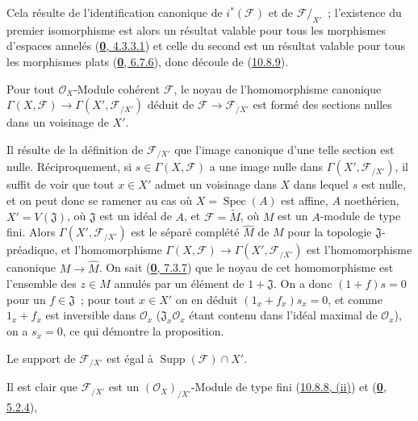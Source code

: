 Cela résulte de l'identification canonique de $i^*(\mathscr{F})$ et de
$\mathscr{F}/_{X'}$~; l'existence du premier isomorphisme est alors un
résultat valable pour tous les morphismes d'espaces annelés
(\hyperref[0.4.3.3.1-fr]{\textbf{0}, 4.3.3.1}) et celle du second est un résultat
valable pour tous les morphismes plats
(\hyperref[0.6.7.6-fr]{\textbf{0}, 6.7.6}), donc découle de
(\hyperref[I.10.8.9-fr]{10.8.9}).

\begin{proposition}[10.8.11]
\label{I.10.8.11-fr}
Pour tout $\mathscr{O}_X$-Module cohérent $\mathscr{F}$, le noyau de
l'homomorphisme canonique
$\Gamma(X,\mathscr{F})\to\Gamma(X',\mathscr{F}_{/X'})$ déduit de
$\mathscr{F}\to\mathscr{F}_{/X'}$ est formé des sections nulles dans un
voisinage de $X'$.
\end{proposition}

Il résulte de la définition de $\mathscr{F}_{/X'}$ que l'image canonique
d'une telle section est nulle. Réciproquement, si
$s\in\Gamma(X,\mathscr{F})$ a une image nulle dans
$\Gamma(X',\mathscr{F}_{/X'})$, il suffit de voir que tout $x\in X'$ admet
un voisinage dans $X$ dans lequel $s$ est nulle, et on peut donc se ramener
au cas où $X=\operatorname{Spec}(A)$ est affine, $A$ noethérien,
$X'=V(\mathfrak{J})$, où $\mathfrak{J}$ est un idéal de $A$, et
$\mathscr{F}=\widetilde M$, où $M$ est un $A$-module de type fini. Alors
$\Gamma(X',\mathscr{F}_{/X'})$ est le séparé complété $\widehat M$ de $M$
pour la topologie $\mathfrak{J}$-préadique, et l'homomorphisme
$\Gamma(X,\mathscr{F})\to\Gamma(X',\mathscr{F}_{/X'})$ est
l'homomorphisme canonique $M\to\widehat M$. On sait
(\hyperref[0.7.3.7-fr]{\textbf{0}, 7.3.7}) que le noyau de cet homomorphisme est
l'ensemble des $z\in M$ annulés par un élément de $1+\mathfrak{J}$. On a
donc $(1+f)s=0$ pour un $f\in\mathfrak{J}$~; pour tout $x\in X'$ on en
déduit $(1_x+f_x)s_x=0$, et comme $1_x+f_x$ est inversible dans
$\mathscr{O}_x$ ($\mathfrak{J}_x\mathscr{O}_x$ étant contenu dans l'idéal
maximal de $\mathscr{O}_x$), on a $s_x=0$, ce qui démontre la proposition.

\begin{corollary}[10.8.12]
\label{I.10.8.12-fr}
Le support de $\mathscr{F}_{/X'}$ est égal à
$\operatorname{Supp}(\mathscr{F})\cap X'$.
\end{corollary}

Il est clair que $\mathscr{F}_{/X'}$ est un
$(\mathscr{O}_X)_{/X'}$-Module de type fini
(\hyperref[I.10.8.8-fr]{10.8.8, (ii)}) et
(\hyperref[0.5.2.4-fr]{\textbf{0}, 5.2.4}),

